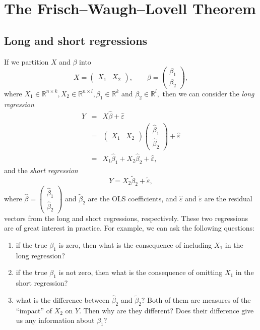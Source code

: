  
\chapter{The Frisch--Waugh--Lovell Theorem}
 \label{chapter::FWL-theorem}

\section{Long and short regressions}

If we partition $X$ and $\beta$ into
\[
X=\left(\begin{array}{cc}
X_{1} & X_{2}\end{array}\right),\qquad\beta=\left(\begin{array}{c}
\beta_{1}\\
\beta_{2}
\end{array}\right),
\]
where $X_{1}\in\mathbb{R}^{n\times k},X_{2}\in\mathbb{R}^{n\times l},\beta_{1}\in\mathbb{R}^{k}$
and $\beta_2 \in  \mathbb{R}^{l},$ then we can consider the {\it long regression} 
\begin{eqnarray*}
Y &=& X\hat{\beta}+\hat{\varepsilon}  \\
&=&\left(\begin{array}{cc}
X_{1} & X_{2}\end{array}\right)\left(\begin{array}{c}
\hat{\beta}_{1}\\
\hat{\beta}_{2}
\end{array}\right)+\hat{\varepsilon} \\
&=&X_{1}\hat{\beta}_{1}+X_{2}\hat{\beta}_{2}+\hat{\varepsilon},
\end{eqnarray*}
 and the {\it short regression} 
\[
Y=X_{2}\tilde{\beta}_{2}+\tilde{\varepsilon},
\]
where $\hat{\beta}=\left(\begin{array}{c}
\hat{\beta}_{1}\\
\hat{\beta}_{2}
\end{array}\right)$ and $\tilde{\beta}_{2}$ are the OLS coefficients, and $\hat{\varepsilon}$
and $\tilde{\varepsilon}$ are the residual vectors from the long
and short regressions, respectively. These two regressions are of great interest
in practice. For example, we can ask the following questions: 
\begin{enumerate}
[(Q1)]
\item if the true $\beta_{1}$ is zero, then what is the consequence of including $X_1$ in the long regression?
\item if the true $\beta_{1}$ is not zero, then what is the consequence
of omitting $X_1$ in the short regression?
\item what is the difference between $\hat{\beta}_{2}$ and $\tilde{\beta}_{2}$?
Both of them are measures of the ``impact'' of $X_{2}$ on $Y$. Then
why are they different? Does their difference give us any information
about $\beta_{1}$?
\end{enumerate}

